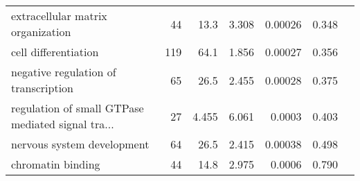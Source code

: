 \begin{longtable}{|l|r|r|r|r|r|}
                 extracellular matrix organization &                      44 &                    13.3 &      3.308 &              0.00026 &                        0.348~~ \\
                              cell differentiation &                     119 &                    64.1 &      1.856 &              0.00027 &                        0.356~~ \\
              negative regulation of transcription &                      65 &                    26.5 &      2.455 &              0.00028 &                        0.375~~ \\
 regulation of small GTPase mediated signal tra... &                      27 &                   4.455 &      6.061 &               0.0003 &                        0.403~~ \\
                        nervous system development &                      64 &                    26.5 &      2.415 &              0.00038 &                        0.498~~ \\
                                 chromatin binding &                      44 &                    14.8 &      2.975 &               0.0006 &                        0.790~~ \\
\end{longtable}
